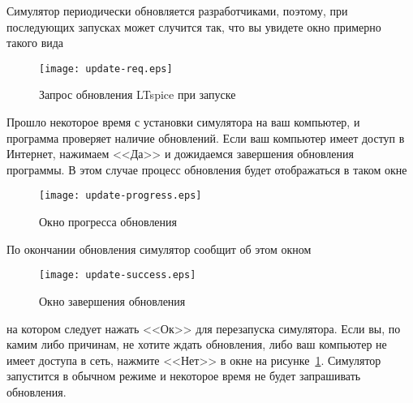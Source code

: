 Симулятор периодически обновляется разработчиками, поэтому, при последующих 
запусках может случится так, что вы увидете окно примерно такого вида

\begin{figure}[H]
 \centering
 \texttt{[image: update-req.eps]}
 \caption{Запрос обновления LTspice при запуске}
 \label{fig:update-req}
\end{figure}
Прошло некоторое время с установки симулятора на ваш 
компьютер, и программа проверяет наличие обновлений. Если ваш компьютер имеет 
доступ в Интернет, нажимаем <<Да>> и дожидаемся завершения обновления 
программы. В этом случае процесс обновления будет отображаться в таком окне

\begin{figure}[H]
 \centering
 \texttt{[image: update-progress.eps]}
 \caption{Окно прогресса обновления}
 \label{fig:update-progress}
\end{figure}
По окончании обновления симулятор сообщит об этом окном
\begin{figure}[H]
 \centering
 \texttt{[image: update-success.eps]}
 \caption{Окно завершения обновления}
 \label{fig:update-success}
\end{figure}
на котором следует нажать <<Ок>> для перезапуска симулятора. Если вы, по камим либо причинам, не хотите 
ждать обновления, либо ваш компьютер не имеет доступа в сеть, нажмите <<Нет>> в окне на 
рисунке~\ref{fig:update-req}. Симулятор запустится в обычном режиме и некоторое 
время не будет запрашивать обновления.

